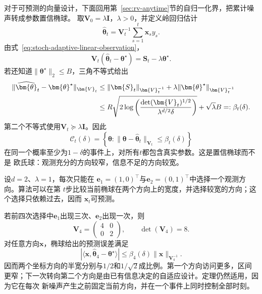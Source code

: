 对于可预测的向量设计，下面回用第~\ref{sec:rv-anytime}节的自归一化界，把累计噪声转成参数置信椭球。
取$\bm{V}_0=\lambda\bm{I}$，$\lambda>0$，并定义岭回归估计
\begin{equation}
  \widehat{\bm{\theta}}_t
  =\bm{V}_t^{-1}\sum_{s=1}^{t}\bm{x}_s y_s.
  \label{eq:stoch-ridge-estimator}
\end{equation}
由式~\eqref{eq:stoch-adaptive-linear-observation}，
\[
  \bm{V}_t
  (\widehat{\bm{\theta}}_t-\bm{\theta}^{\star})
  =
  \bm{S}_t-\lambda\bm{\theta}^{\star}.
  \]
若还知道$\lVert\bm{\theta}^{\star}\rVert_2\leq B$，三角不等式给出
\begin{align}
  \lVert
    \widehat{\bm{\theta}}_t-\bm{\theta}^{\star}
  \rVert_{\bm{V}_t}
  &\leq
  \lVert\bm{S}_t\rVert_{\bm{V}_t^{-1}}
  +
  \lambda
  \lVert\bm{\theta}^{\star}\rVert_{\bm{V}_t^{-1}}
  \notag\\
  &\leq
  R\sqrt{
    2\log\left(
      \frac{\det(\bm{V}_t)^{1/2}}
           {\lambda^{d/2}\delta}
    \right)
  }
  +\sqrt{\lambda}B
  =:\beta_t(\delta).
  \label{eq:stoch-adaptive-confidence-ellipsoid}
\end{align}
第二个不等式使用$\bm{V}_t\succeq\lambda\bm{I}$。因此
\[
  \mathcal{C}_t(\delta)
  =
  \left\{
    \bm{\theta}:
    \lVert\bm{\theta}-\widehat{\bm{\theta}}_t
    \rVert_{\bm{V}_t}
    \leq\beta_t(\delta)
  \right\}
\]
在同一个概率至少为$1-\delta$的事件上，对所有$t$都包含真实参数。这是置信椭球而不是
欧氏球：观测充分的方向较窄，信息不足的方向较宽。

\begin{example}[二维自适应查询]
  \label{ex:stoch-two-dimensional-adaptive-design}
  设$d=2$、$\lambda=1$，每次只能在
  $\bm{e}_1=(1,0)^\top$与$\bm{e}_2=(0,1)^\top$中选择一个观测方向。算法可以在第
  $t$步比较当前椭球在两个方向上的宽度，并选择较宽的方向；这个选择只依赖过去，因而
  $\bm{x}_t$可预测。

  若前四次选择中$\bm{e}_1$出现三次、$\bm{e}_2$出现一次，则
  \[
    \bm{V}_4
    =
    \begin{pmatrix}
      4&0\\
      0&2
    \end{pmatrix},
    \qquad
    \det(\bm{V}_4)=8.
  \]
  对任意方向$\bm{x}$，椭球给出的预测误差满足
  \[
    |\langle
      \bm{x},
      \widehat{\bm{\theta}}_4-\bm{\theta}^{\star}
    \rangle|
    \leq
    \beta_4(\delta)
    \lVert\bm{x}\rVert_{\bm{V}_4^{-1}}.
  \]
  因而两个坐标方向的半宽分别与$1/2$和$1/\sqrt2$成比例。第一个方向访问更多，区间
  更窄；下一次转向第二个方向是由已有信息决定的自适应设计。定理仍然适用，因为它在每次
  新噪声产生之前固定当前方向，并在一个事件上同时控制全部时刻。
\end{example}

